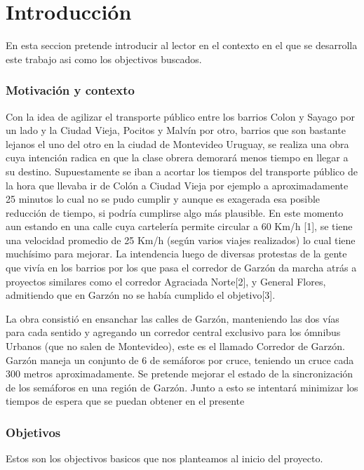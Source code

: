\chapter{Introducción}
En esta seccion pretende introducir al lector en el contexto en el que se desarrolla este trabajo asi como los objectivos buscados.

\subsection{Motivación y contexto}
Con  la  idea  de  agilizar  el  transporte  público  entre  los
barrios Colon y Sayago por un lado y la Ciudad Vieja, Pocitos
y Malvín por otro, barrios que son bastante lejanos el uno del
otro en la ciudad de Montevideo Uruguay, se realiza una obra
cuya  intención radica  en que la  clase obrera demorará  menos
tiempo en llegar a su destino.
Supuestamente se iban a acortar los tiempos del transporte
público de la hora que llevaba ir de Colón a Ciudad Vieja por
ejemplo  a  aproximadamente  25  minutos  lo  cual  no  se  pudo
cumplir  y  aunque  es  exagerada  esa  posible  reducción  de
tiempo,  si  podría  cumplirse  algo  más  plausible.  En  este
momento  aun  estando  en  una  calle  cuya  cartelería  permite
circular a 60 Km/h  [1], se tiene una velocidad promedio de 25
Km/h (según varios viajes realizados) lo cual tiene muchísimo
para mejorar.
La intendencia luego de diversas protestas de la gente que
vivía en los barrios por los que pasa el corredor de Garzón da
marcha atrás a proyectos similares como el corredor Agraciada
Norte[2],  y  General  Flores,  admitiendo  que  en  Garzón  no  se
había cumplido el objetivo[3].

La  obra  consistió  en  ensanchar  las  calles  de  Garzón,
manteniendo  las  dos  vías  para  cada  sentido  y  agregando  un
corredor central exclusivo para los ómnibus Urbanos (que no
salen de Montevideo), este es el llamado Corredor de Garzón.
Garzón  maneja  un  conjunto de 6 de  semáforos por  cruce,
teniendo  un  cruce  cada  300  metros  aproximadamente.  Se
pretende  mejorar  el  estado  de  la  sincronización  de  los
semáforos en  una región de Garzón. Junto a esto se intentará
minimizar los tiempos de espera que se puedan obtener en el
presente
\newpage

\subsection{Objetivos}

Estos son los objectivos basicos que nos planteamos al inicio del  proyecto.


